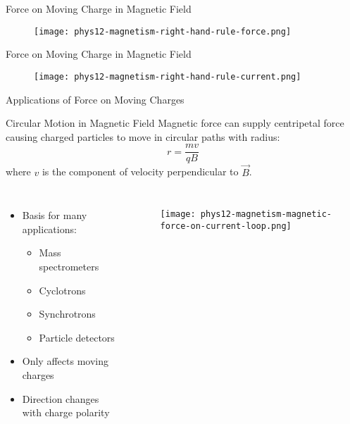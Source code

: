 \documentclass{beamer}
\begin{document}
\begin{frame}{Force on Moving Charge in Magnetic Field}
    \begin{figure}
        \centering
        \texttt{[image: phys12-magnetism-right-hand-rule-force.png]}
    \end{figure}
\end{frame}
\begin{frame}{Force on Moving Charge in Magnetic Field}
    
\begin{figure}
    \centering
    \texttt{[image: phys12-magnetism-right-hand-rule-current.png]}
\end{figure}
\end{frame}

\begin{frame}{Applications of Force on Moving Charges}
\begin{block}{Circular Motion in Magnetic Field}
Magnetic force can supply centripetal force causing charged particles to move in circular paths with radius:
\begin{equation}
r = \frac{mv}{qB}
\end{equation}
where $v$ is the component of velocity perpendicular to $\vec{B}$.
\end{block}

\begin{columns}
\begin{itemize}
\item Basis for many applications:
  \begin{itemize}
  \item Mass spectrometers
  \item Cyclotrons
  \item Synchrotrons
  \item Particle detectors
  \end{itemize}
\item Only affects moving charges
\item Direction changes with charge polarity
\end{itemize}

\begin{figure}
    \centering
    \texttt{[image: phys12-magnetism-magnetic-force-on-current-loop.png]}
\end{figure}
\end{columns}
\end{frame}
\end{document}
